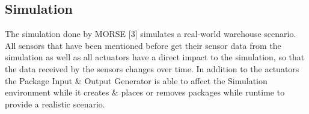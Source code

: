 \documentclass{article}
\begin{document}
\subsection{Simulation}
The simulation done by MORSE [3] simulates a real-world warehouse scenario. All sensors that have been mentioned before get their sensor data from the simulation as well as all actuators have a direct impact to the simulation, so that the data received by the sensors changes over time. In addition to the actuators
the Package Input \& Output Generator is able to affect the Simulation environment while it creates \& places or removes packages while runtime to provide a realistic scenario.
\end{document}
